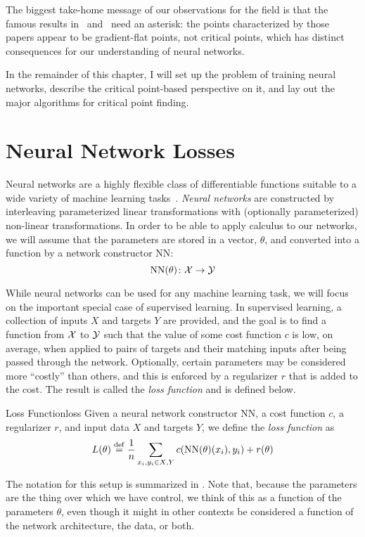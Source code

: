 \documentclass[../../thesis.tex]{subfiles}
\begin{document}
The biggest take-home message of our observations for the field
is that the famous results
in~\cite{dauphin2014} and~\cite{pennington2017}
need an asterisk:
the points characterized by those papers appear to be
gradient-flat points, not critical points,
which has distinct consequences for our understanding of neural networks.

In the remainder of this chapter,
I will set up the problem of training neural networks,
describe the critical point-based perspective on it,
and lay out the major algorithms for critical point finding.

\section{Neural Network Losses}

Neural networks are a highly flexible class of
differentiable functions
suitable to a wide variety of
machine learning tasks~\cite{lecun2015}.
\emph{Neural networks} are constructed by interleaving
parameterized linear transformations
with (optionally parameterized) non-linear transformations.
In order to be able to apply calculus
to our networks, we will assume that
the parameters are stored in a vector, $\theta$,
and converted into a function by a network constructor $\mathrm{NN}$:
\begin{equation}
	\mathrm{NN}(\theta) \colon {\mathcal{X}} \to {\mathcal{Y}}
\end{equation}

While neural networks can be used for any machine learning task,
we will focus on the important special case of supervised learning.
In supervised learning, a collection of inputs $X$ and targets $Y$
are provided, and the goal is to find a function from ${\mathcal{X}}$ to ${\mathcal{Y}}$
such that the value of some cost function $c$ is low, on average, when applied to
pairs of targets and their matching inputs after being passed through the network.
Optionally, certain parameters may be considered more \enquote{costly}
than others, and this is enforced by a regularizer $r$
that is added to the cost.
The result is called the \emph{loss function}
and is defined below.
\begin{definition}{Loss Function}{loss}
	Given a neural network constructor $\mathrm{NN}$,
	a cost function $c$,
	a regularizer $r$,
	and input data $X$ and targets $Y$,
	we define the \emph{loss function} as
	\begin{equation}\equationlabel{def-loss}
		L(\theta) \defeq \frac{1}{n}\sum_{x_i, y_i \in X, Y} c(\mathrm{NN}(\theta)(x_i), y_i) + r(\theta)
	\end{equation}
\end{definition}
The notation for this setup is summarized in .
Note that,
because the parameters are the thing over which we have control,
we think of this as a function of the parameters $\theta$,
even though it might in other contexts be considered
a function of the network architecture, the data, or both.
\end{document}
